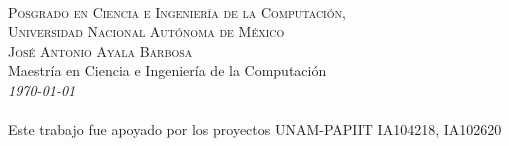 ~\vfill
\thispagestyle{empty}

\noindent \textsc{Posgrado en Ciencia e Ingeniería de la Computación,\\ Universidad Nacional Autónoma de México}\\

\noindent \textsc{José Antonio Ayala Barbosa}\\

\noindent Maestría en Ciencia e Ingeniería de la Computación\\
\noindent \textit{\today}\\
\\
Este trabajo fue apoyado por los proyectos UNAM-PAPIIT IA104218, IA102620